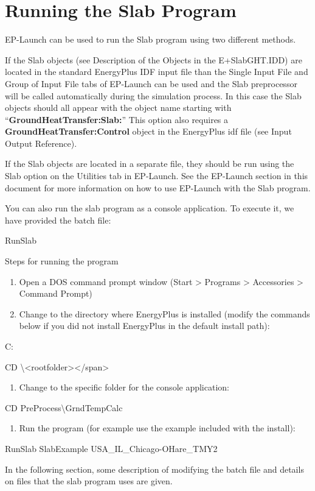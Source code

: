 \section{Running the Slab Program}\label{running-the-slab-program}

EP-Launch can be used to run the Slab program using two different methods.

If the Slab objects (see Description of the Objects in the E+SlabGHT.IDD) are located in the standard EnergyPlus IDF input file than the Single Input File and Group of Input File tabs of EP-Launch can be used and the Slab preprocessor will be called automatically during the simulation process. In this case the Slab objects should all appear with the object name starting with ``\textbf{GroundHeatTransfer:Slab:}'' This option also requires a \textbf{GroundHeatTransfer:Control} object in the EnergyPlus idf file (see Input Output Reference).

If the Slab objects are located in a separate file, they should be run using the Slab option on the Utilities tab in EP-Launch. See the EP-Launch section in this document for more information on how to use EP-Launch with the Slab program.

You can also run the slab program as a console application. To execute it, we have provided the batch file:

RunSlab

Steps for running the program

\begin{enumerate}
\def\labelenumi{\arabic{enumi})}
\item
  Open a DOS command prompt window (Start > Programs > Accessories > Command Prompt)
\item
  Change to the directory where EnergyPlus is installed (modify the commands below if you did not install EnergyPlus in the default install path):
\end{enumerate}

C:

CD \textbackslash{}\textless{}rootfolder\textgreater{}\textless{}/span\textgreater{}

\begin{enumerate}
\def\labelenumi{\arabic{enumi})}
\setcounter{enumi}{2}
\tightlist
\item
  Change to the specific folder for the console application:
\end{enumerate}

CD PreProcess\textbackslash{}GrndTempCalc

\begin{enumerate}
\def\labelenumi{\arabic{enumi})}
\setcounter{enumi}{3}
\tightlist
\item
  Run the program (for example use the example included with the install):
\end{enumerate}

RunSlab SlabExample USA\_IL\_Chicago-OHare\_TMY2

In the following section, some description of modifying the batch file and details on files that the slab program uses are given.
